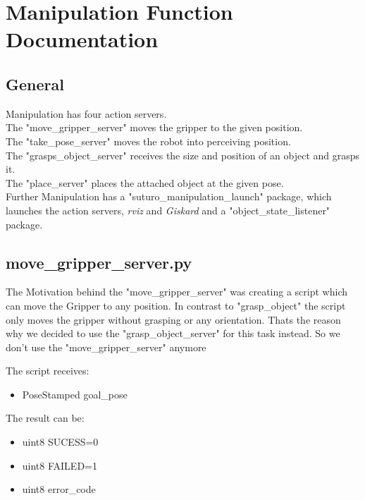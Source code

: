 \documentclass[main.tex]{subfiles}
\begin{document}
	\begingroup

	\renewcommand{\cleardoublepage}{}

	\renewcommand{\clearpage}{}

	\chapter{Manipulation Function Documentation}


		
		\section{General}

		Manipulation has four action servers.\\
		The "move\_gripper\_server" moves the gripper to the given position.\\
		The "take\_pose\_server" moves the robot into perceiving position.\\
		The "grasps\_object\_server" receives the size and position of an object and grasps it.\\
		The "place\_server" places the attached object at the given pose.\\
		Further Manipulation has a "suturo\_manipulation\_launch" package, which launches the action servers, \textit{rviz} and \textit{Giskard} and a "object\_state\_listener" package.
		
		\newpage


		\section{move\_gripper\_server.py} 
		The Motivation behind the "move\_gripper\_server" was creating a script which can move the Gripper to any position. In contrast to "grasp\_object" the script only moves the gripper without grasping or any orientation.
		Thats the reason why we decided to use the "grasp\_object\_server" for this task instead. So we don't use the "move\_gripper\_server" anymore
		
		\vspace{0.75cm}
		The script receives:
		\begin{itemize}
		 \item PoseStamped goal\_pose
     	\end{itemize} 
     	
     	 \vspace{0,75 cm}
     	 The result can be:
     	\begin{itemize}
     		\item uint8 SUCESS=0
     		\item uint8 FAILED=1
     		\item uint8 error\_code
     	\end{itemize}
     	
\end{document}

